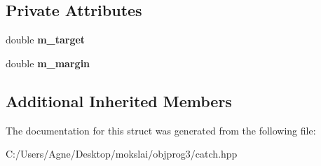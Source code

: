 \subsection*{Private Attributes}
\begin{DoxyCompactItemize}
\item 
\mbox{\label{struct_catch_1_1_matchers_1_1_floating_1_1_within_abs_matcher_a8d9f249c0e2969cf0522dc81db6ff280}} 
double {\bfseries m\+\_\+target}
\item 
\mbox{\label{struct_catch_1_1_matchers_1_1_floating_1_1_within_abs_matcher_a2270487cd55fa06044f5f6aaab724c5f}} 
double {\bfseries m\+\_\+margin}
\end{DoxyCompactItemize}
\subsection*{Additional Inherited Members}


The documentation for this struct was generated from the following file\+:\begin{DoxyCompactItemize}
\item 
C\+:/\+Users/\+Agne/\+Desktop/mokslai/objprog3/catch.\+hpp\end{DoxyCompactItemize}
